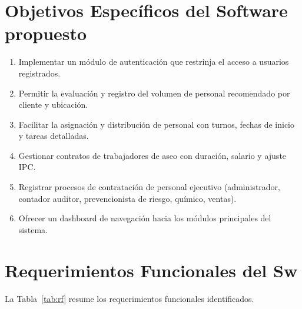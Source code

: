 \documentclass[12pt,a4paper]{report}
\begin{document}
\section{Objetivos Específicos del Software propuesto}

\begin{enumerate}
  \item Implementar un módulo de autenticación que restrinja el acceso a usuarios registrados.
  \item Permitir la evaluación y registro del volumen de personal recomendado por cliente y ubicación.
  \item Facilitar la asignación y distribución de personal con turnos, fechas de inicio y tareas detalladas.
  \item Gestionar contratos de trabajadores de aseo con duración, salario y ajuste IPC.
  \item Registrar procesos de contratación de personal ejecutivo (administrador, contador auditor, prevencionista de riesgo, químico, ventas).
  \item Ofrecer un dashboard de navegación hacia los módulos principales del sistema.
\end{enumerate}

\pagebreak
\section{Requerimientos Funcionales del Sw}

La Tabla~\ref{tab:rf} resume los requerimientos funcionales identificados.
\end{document}
